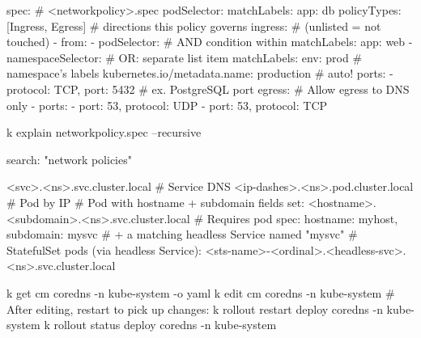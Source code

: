 \begin{tcbitemize}[
  raster columns=4, raster equal height=rows,
  blanker, cheat subtitle
]
\begin{tcbitemize}[
        raster columns=1, raster equal height=rows,
        blanker, cheat subtitle
      ]
        \begin{cheatcodebash}
        spec:                    # <networkpolicy>.spec
          podSelector: {matchLabels: {app: db}}
          policyTypes: [Ingress, Egress] # directions this policy governs
          ingress:                       # (unlisted = not touched)
          - from:
            - podSelector:       # AND condition within {}
                matchLabels: {app: web}
            - namespaceSelector: # OR: separate list item
                matchLabels:
                  env: prod      # namespace's labels
                  kubernetes.io/metadata.name: production # auto!
            ports:
            - {protocol: TCP, port: 5432} # ex. PostgreSQL port
          egress:  # Allow egress to DNS only
          - ports:
            - {port: 53, protocol: UDP}
            - {port: 53, protocol: TCP}
        \end{cheatcodebash}

        \begin{cheatcodebash}
        k explain networkpolicy.spec --recursive
        \end{cheatcodebash}

        \begin{cheatcodebash}
        search: "network policies"
        \end{cheatcodebash}


      \tcbitem
        \begin{cheatcodebash}
<svc>.<ns>.svc.cluster.local        # Service DNS
<ip-dashes>.<ns>.pod.cluster.local  # Pod by IP
# Pod with hostname + subdomain fields set:
<hostname>.<subdomain>.<ns>.svc.cluster.local
# Requires pod spec: hostname: myhost, subdomain: mysvc
# + a matching headless Service named "mysvc"
# StatefulSet pods (via headless Service):
<sts-name>-<ordinal>.<headless-svc>.<ns>.svc.cluster.local
        \end{cheatcodebash}

        \begin{cheatcodebash}
        k get cm coredns -n kube-system -o yaml
        k edit cm coredns -n kube-system
        # After editing, restart to pick up changes:
        k rollout restart deploy coredns -n kube-system
        k rollout status  deploy coredns -n kube-system
        \end{cheatcodebash}


\end{tcbitemize}
\end{tcbitemize}
